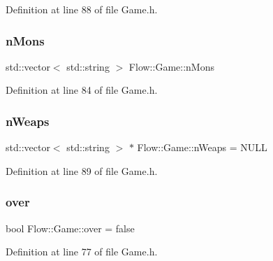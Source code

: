 Definition at line 88 of file Game.\+h.

\hypertarget{struct_flow_1_1_game_a02a99aab36d412ff3fa39f33d9d8f75c}{}\label{struct_flow_1_1_game_a02a99aab36d412ff3fa39f33d9d8f75c} 
\subsubsection{\texorpdfstring{n\+Mons}{nMons}}
{\footnotesize\ttfamily std\+::vector$<$ std\+::string $>$ Flow\+::\+Game\+::n\+Mons\hspace{0.3cm}{\ttfamily [static]}}



Definition at line 84 of file Game.\+h.

\hypertarget{struct_flow_1_1_game_ae8f060eae77f91be1be9d54b58e4cb2b}{}\label{struct_flow_1_1_game_ae8f060eae77f91be1be9d54b58e4cb2b} 
\subsubsection{\texorpdfstring{n\+Weaps}{nWeaps}}
{\footnotesize\ttfamily std\+::vector$<$ std\+::string $>$ $\ast$ Flow\+::\+Game\+::n\+Weaps = N\+U\+LL\hspace{0.3cm}{\ttfamily [static]}}



Definition at line 89 of file Game.\+h.

\hypertarget{struct_flow_1_1_game_afcbe054fdbcd4eeefabd75ce3ffbe9dd}{}\label{struct_flow_1_1_game_afcbe054fdbcd4eeefabd75ce3ffbe9dd} 
\subsubsection{\texorpdfstring{over}{over}}
{\footnotesize\ttfamily bool Flow\+::\+Game\+::over = false\hspace{0.3cm}{\ttfamily [static]}}



Definition at line 77 of file Game.\+h.

\hypertarget{struct_flow_1_1_game_a82056349f2d164e104b496d0adf59e61}{}\label{struct_flow_1_1_game_a82056349f2d164e104b496d0adf59e61} 
